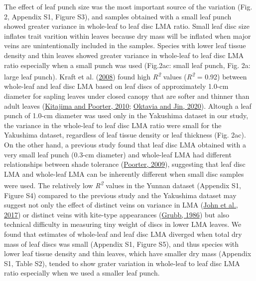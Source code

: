 \documentclass[
  12pt,
  a4paper,
,tablecaptionabove
]{scrartcl}
\begin{document}
The effect of leaf punch size was the most important source of the variation (Fig. 2, Appendix S1, Figure S3), and samples obtained with a small leaf punch showed greater variance in whole-leaf to leaf disc LMA ratio.
Small leaf disc size inflates trait varition within leaves because dry mass will be inflated when major veins are unintentionally included in the samples.
Species with lower leaf tissue density and thin leaves showed greater variance in whole-leaf to leaf disc LMA ratio especially when a small punch was used (Fig.2ac: small leaf punch, Fig. 2a: large leaf punch).
Kraft et al. (\protect\hyperlink{ref-Kraft2008}{2008}) found high \emph{R\textsuperscript{2}} values (\emph{R\textsuperscript{2}} = 0.92) between whole-leaf and leaf disc LMA based on leaf discs of approximately 1.0-cm diameter for sapling leaves under closed canopy that are softer and thinner than adult leaves (\protect\hyperlink{ref-Kitajima2010}{Kitajima and Poorter, 2010}; \protect\hyperlink{ref-Oktavia2020}{Oktavia and Jin, 2020}).
Altough a leaf punch of 1.0-cm diameter was used only in the Yakushima dataset in our study, the variance in the whole-leaf to leaf disc LMA ratio were small for the Yakushima dataset, regardless of leaf tissue density or leaf thickness (Fig. 2ac).
On the other hand, a previous study found that leaf disc LMA obtained with a very small leaf punch (0.3-cm diameter) and whole-leaf LMA had different relationships between shade tolerance (\protect\hyperlink{ref-Poorter2009a}{Poorter, 2009}), suggesting that leaf disc LMA and whole-leaf LMA can be inherently different when small disc samples were used.
The relatively low \emph{R\textsuperscript{2}} values in the Yunnan dataset (Appendix S1, Figure S4) compared to the previous study and the Yakushima dataset may suggest not only the effect of distinct veins on variance in LMA (\protect\hyperlink{ref-John2017}{John et al., 2017}) or distinct veins with kite-type appearances (\protect\hyperlink{ref-Grubb1986}{Grubb, 1986}) but also technical difficulty in measuring tiny weight of discs in lower LMA leaves.
We found that estimates of whole-leaf and leaf disc LMA diverged when total dry mass of leaf discs was small (Appendix S1, Figure S5), and thus species with lower leaf tissue density and thin leaves, which have smaller dry mass (Appendix S1, Table S2), tended to show grater variation in whole-leaf to leaf disc LMA ratio especially when we used a smaller leaf punch.
\end{document}
